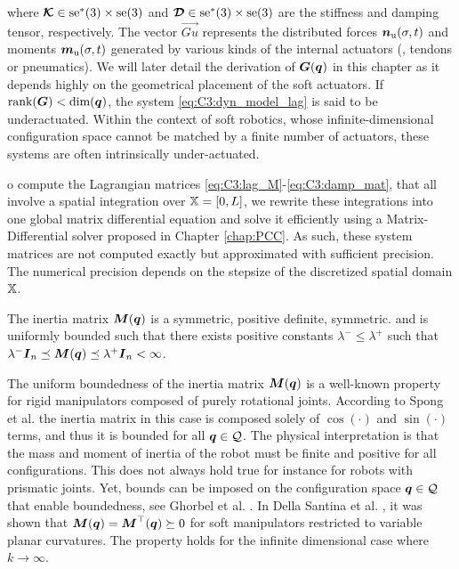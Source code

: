 %
where $\boldsymbol{\mathcal{K}} \in \textup{\textrm{se}}^*(3) \times \textup{\textrm{se}}(3)$ and $\boldsymbol{\mathcal{D}} \in  \textup{\textrm{se}}^*(3) \times \textup{\textrm{se}}(3)$ are the stiffness and damping tensor, respectively.
The vector $\vec{Gu}$ represents the distributed forces ${\boldsymbol{n}}_\textrm{u}(\sigma,t)$ and moments ${\boldsymbol{m}}_\textrm{u}(\sigma,t)$ generated by various kinds of the internal actuators (\eg, tendons or pneumatics). We will later detail the derivation of ${\boldsymbol{G}}({\boldsymbol{q}})$ in this chapter as it depends highly on the geometrical placement of the soft actuators. If $\textnormal{rank}({\boldsymbol{G}}) < \text{dim}({\boldsymbol{q}})$, the system \eqref{eq:C3:dyn_model_lag} is said to be underactuated. Within the context of soft robotics, whose infinite-dimensional configuration space cannot be matched by a finite number of actuators, these systems are often intrinsically under-actuated. 

o compute the Lagrangian matrices \eqref{eq:C3:lag_M}-\eqref{eq:C3:damp_mat}, that all involve a spatial integration over $\mathbb{X} = [0,L]$, we rewrite these integrations into one global matrix differential equation and solve it efficiently using a Matrix-Differential solver proposed in Chapter \ref{chap:PCC}. As such, these system matrices are not computed exactly but approximated with sufficient precision. The numerical precision depends on the stepsize of the discretized spatial domain $\mathbb{X}$. 
\begin{asm}
\label{lem:C3:1}
The inertia matrix $\boldsymbol{M}(\boldsymbol{q})$ is a symmetric, positive definite, symmetric. and is uniformly bounded such that there exists positive constants $\lambda^{-} \le \lambda^{+}$ such that  $\lambda^{-} \boldsymbol{I}_{n} \preceq \boldsymbol{M}(\boldsymbol{q}) \preceq \lambda^{+} \boldsymbol{I}_{n} < \infty$.
\end{asm}

The uniform boundedness of the inertia matrix ${\boldsymbol{M}}({\boldsymbol{q}})$ is a well-known property for rigid manipulators composed of purely rotational joints. According to Spong et al. \cite{Spong2006} the inertia matrix in this case is composed solely of $\cos(\cdot)$ and $\sin(\cdot)$ terms, and thus it is bounded for all ${\boldsymbol{q}} \in \mathcal{Q}$. The physical interpretation is that the mass and moment of inertia of the robot must be finite and positive for all configurations. This does not always hold true for instance for robots with prismatic joints. Yet, bounds can be imposed on the configuration space ${\boldsymbol{q}} \in \mathcal{Q}$ that enable boundedness, see Ghorbel et al. \cite{Ghorbel1998Dec}. In Della Santina et al. \cite{DellaSantina2020a}, it was shown that ${\boldsymbol{M}}({\boldsymbol{q}}) = {\boldsymbol{M}}^\top({\boldsymbol{q}}) \succeq 0$ for soft manipulators restricted to variable planar curvatures. The property holds for the infinite dimensional case where $k \to \infty$. 

